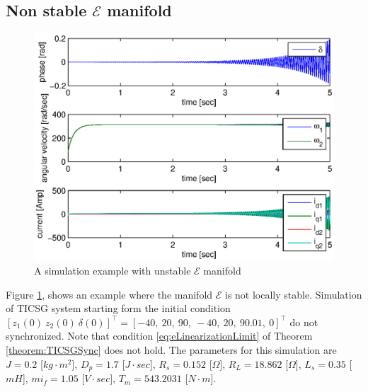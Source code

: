 \documentclass[letterpaper, 10 pt, conference]{ieeeconf}
\newcommand{\Emscr}  {{\mathcal{E}}}
\begin{document}
\subsection{Non stable $\mathscr{E}$ manifold}

\begin{figure}[ht]
\includegraphics[scale=0.65]{NonStableTICSGSimulation}

\caption{A simulation example with unstable $\Emscr$ manifold}
\label{fig:NonStableTICSGSimulation}
\end{figure}

Figure \ref{fig:NonStableTICSGSimulation}, shows an example where the
manifold $\mathscr{E}$ is not locally stable. Simulation of TICSG
system starting form the initial condition $\left[z_1(0)\ z_2(0) \
\delta(0) \right]^\top = \left[ -40, \ 20, \ 90, \ -40, \ 20, \ 90.01,
\ 0 \right]^\top$ do not synchronized. Note that condition
\eqref{eq:eLinearizationLimit} of Theorem \ref{theorem:TICSGSync} does
not hold. The parameters for this simulation are $J=0.2$
{[}$kg\cdot m^{2}${]}, $D_{p}=1.7$ {[}$J\cdot sec${]}, $R_{s}=0.152$
{[}$\Omega]$, $R_{L}=18.862$ {[}$\Omega]$, $L_{s}=0.35$ {[}$mH${]},
$mi_{f}=1.05$ {[}$V\cdot sec]$, $T_{m}=543.2031$ {[}$N\cdot m${]}.
%

\end{document}
